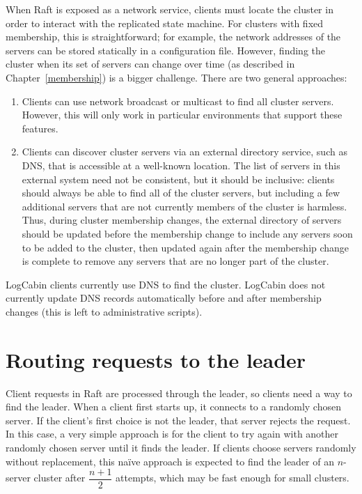When Raft is exposed as a network service,
clients must locate the cluster in order to interact with the replicated
state machine.
For clusters with fixed membership, this is straightforward; for
example, the network addresses of the servers can be stored statically
in a configuration file. However, finding the cluster when its set of
servers can change over time (as described in Chapter~\ref{membership})
is a bigger challenge. There are two general approaches:
%
\begin{enumerate}
%
\item Clients can use network broadcast or multicast to find all cluster
servers. However, this will only work in particular environments that
support these features.
%
\item Clients can discover cluster servers via an external directory
service, such
as DNS, that is accessible at a well-known location. The list of servers
in this external system need not be consistent, but it should be inclusive:
clients should always be able to find all of the cluster servers, but
including a few additional servers that are not currently members of the
cluster is harmless. Thus, during cluster membership changes, the
external directory
of servers should be updated before the membership change to include any
servers soon to be added to the cluster, then updated again after the
membership change is complete to remove any servers that are no longer
part of the cluster.
%
\end{enumerate}
%
%
LogCabin clients currently use DNS to find the cluster. LogCabin does not
currently update DNS records automatically before and after membership
changes (this is left to administrative scripts).

\section{Routing requests to the leader}
\label{clients:findleader}

Client requests in Raft are processed through the leader, so clients
need a way to find the leader.
When a client
first starts up, it connects to a randomly chosen server. If the
client's first choice is not the leader, that server rejects the
request. In this case, a very simple approach is for the client to try
again with another randomly chosen server until it finds the leader.
If clients choose servers randomly
without replacement, this na\"ive approach is expected to find the
leader of an $n$-server cluster after $\dfrac{n+1}{2}$ attempts,
which may be fast enough for small clusters.


